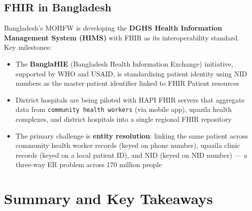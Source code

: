 \documentclass[12pt,a4paper]{article}
\begin{document}
\subsection{FHIR in Bangladesh}

Bangladesh's MOHFW is developing the \textbf{DGHS Health Information Management System (HIMS)} with FHIR as its interoperability standard.  Key milestones:
\begin{itemize}[leftmargin=1.8em]
  \item The \textbf{BanglaHIE} (Bangladesh Health Information Exchange) initiative, supported by WHO and USAID, is standardising patient identity using NID numbers as the master patient identifier linked to FHIR Patient resources
  \item District hospitals are being piloted with HAPI FHIR servers that aggregate data from \texttt{community health workers} (via mobile app), upazila health complexes, and district hospitals into a single regional FHIR repository
  \item The primary challenge is \textbf{entity resolution}: linking the same patient across community health worker records (keyed on phone number), upazila clinic records (keyed on a local patient ID), and NID (keyed on NID number) --- a three-way ER problem across 170 million people
\end{itemize}

\section{Summary and Key Takeaways}
\end{document}
